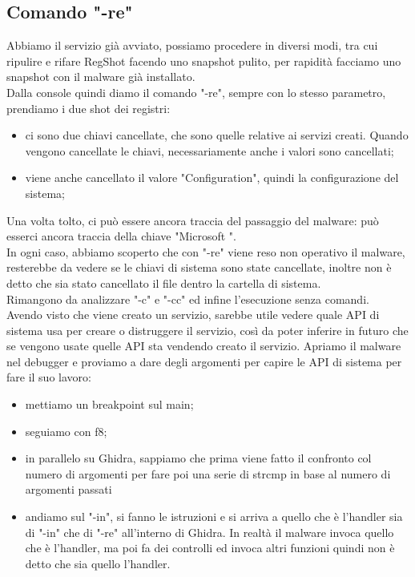 \documentclass[12pt, oneside]{extbook}
\begin{document}
\subsection{Comando "-re"}
Abbiamo il servizio già avviato, possiamo procedere in diversi modi, tra cui ripulire e rifare RegShot facendo uno snapshot pulito, per rapidità facciamo uno snapshot con il malware già installato.\\Dalla console quindi diamo il comando "-re", sempre con lo stesso parametro, prendiamo i due shot dei registri:
\begin{itemize}
\item ci sono due chiavi cancellate, che sono quelle relative ai servizi creati. Quando vengono cancellate le chiavi, necessariamente anche i valori sono cancellati;
\item viene anche cancellato il valore "Configuration", quindi la configurazione del sistema;
\end{itemize}
Una volta tolto, ci può essere ancora traccia del passaggio del malware: può esserci ancora traccia della chiave "Microsoft ".\\In ogni caso, abbiamo scoperto che con "-re" viene reso non operativo il malware, resterebbe da vedere se le chiavi di sistema sono state cancellate, inoltre non è detto che sia stato cancellato il file dentro la cartella di sistema.\\Rimangono da analizzare "-c" e "-cc" ed infine l'esecuzione senza comandi.\\Avendo visto che viene creato un servizio, sarebbe utile vedere quale API di sistema usa per creare o distruggere il servizio, così da poter inferire in futuro che se vengono usate quelle API sta vendendo creato il servizio. Apriamo il malware nel debugger e proviamo a dare degli argomenti per capire le API di sistema per fare il suo lavoro:
\begin{itemize}
\item mettiamo un breakpoint sul main;
\item seguiamo con f8;
\item in parallelo su Ghidra, sappiamo che prima viene fatto il confronto col numero di argomenti per fare poi una serie di strcmp in base al numero di argomenti passati
\item andiamo sul "-in", si fanno le istruzioni e si arriva a quello che è l'handler sia di "-in" che di "-re" all'interno di Ghidra. In realtà il malware invoca quello che è l'handler, ma poi fa dei controlli ed invoca altri funzioni quindi non è detto che sia quello l'handler.
\end{itemize} 
\end{document}
